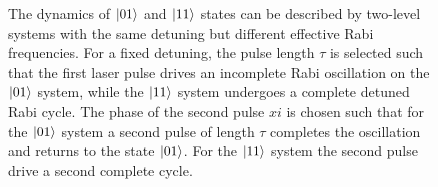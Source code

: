 \documentclass[rmp,10pt,onecolumn,fleqn,notitlepage]{revtex4-1}
\begin{document}
    \begin{figure}[h!]
    \begin{minipage}[c]{0.49\linewidth}
    \centering
    \end{minipage}
    \begin{minipage}[]{0.49\linewidth}
    \centering
    \end{minipage}
    \caption{The dynamics of $\left\vert{01}\right\rangle$ and $\left\vert{11}\right\rangle$ states can be described by two-level systems with the same detuning but different effective Rabi frequencies. For a fixed detuning, the pulse length $\tau$ is selected such that the first laser pulse drives an incomplete Rabi oscillation on the $\left\vert{01}\right\rangle$ system, while the $\left\vert{11}\right\rangle$ system undergoes a complete detuned Rabi cycle. The phase of the second pulse $xi$ is chosen such that for the $\left\vert{01}\right\rangle$ system a second pulse of length $\tau$ completes the oscillation and returns to the state $\left\vert{01}\right\rangle$. For the $\left\vert{11}\right\rangle$ system the second pulse drive a second complete cycle.}
    \label{fig:dynamics}
    \end{figure}

\clearpage
\end{document}
